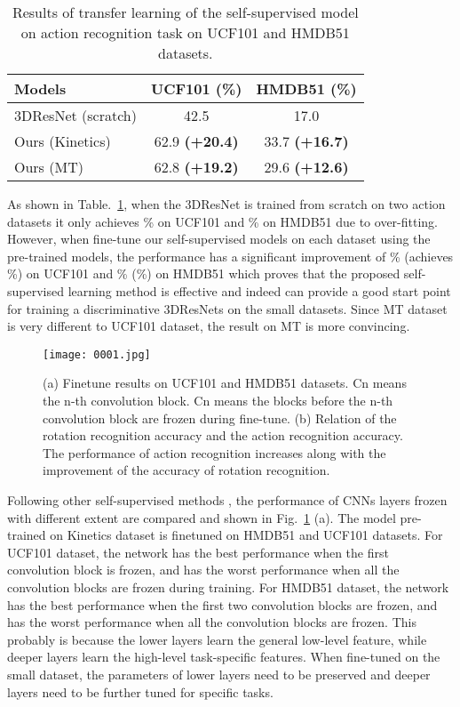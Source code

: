 \documentclass[10pt,twocolumn,letterpaper]{article}
\begin{document}
\begin{table}[hb]
\begin{center}
\begin{tabular}{l|c|c}
\hline
Models & UCF101 (\%) & HMDB51 (\%) \\
\hline\hline
3DResNet (scratch) \cite{3DResNet} & 42.5   & 17.0\\
Ours (Kinetics)                & 62.9 \textbf{(+20.4)}  & 33.7 \textbf{(+16.7)}\\
Ours (MT)                      & 62.8 \textbf{(+19.2)}  & 29.6 \textbf{(+12.6)}\\
\hline
\end{tabular}
\end{center}
\caption{Results of transfer learning of the self-supervised model on action recognition task on UCF101 and HMDB51 datasets.}
\label{tab:transfer}
\end{table}



As shown in Table.~\ref{tab:transfer}, when the 3DResNet is trained from scratch on two action datasets it only achieves \% on UCF101 and \% on HMDB51 due to over-fitting. However, when fine-tune our self-supervised models on each dataset using the pre-trained models, the performance has a significant improvement of \% (achieves \%) on UCF101 and \% (\%) on HMDB51  which proves that the proposed self-supervised learning method is effective and indeed can provide a good start point for training a discriminative 3DResNets on the small datasets. Since MT dataset is very different to UCF101 dataset, the result on MT is more convincing. 

\begin{figure}
\begin{center}
\texttt{[image: 0001.jpg]}
\end{center}
\caption{(a) Finetune results on UCF101 and HMDB51 datasets. Cn means the n-th convolution block. Cn means the blocks before the n-th convolution block are frozen during fine-tune. (b) Relation of the rotation recognition accuracy and the action recognition accuracy. The performance of action recognition increases along with the improvement of the accuracy of rotation recognition. }
\label{fig:rotation-acc}
\end{figure}

Following other self-supervised methods \cite{watchingmove}, the performance of CNNs layers frozen with different extent are compared and shown in Fig.~\ref{fig:rotation-acc} (a). The model pre-trained on Kinetics dataset is finetuned on HMDB51 and UCF101 datasets. For UCF101 dataset, the network has the best performance when the first convolution block is frozen, and has the worst performance when all the convolution blocks are frozen during training. For HMDB51 dataset, the network has the best performance when the first two convolution blocks are frozen, and has the worst performance when all the convolution blocks are frozen. This probably is because the lower layers learn the general low-level feature, while deeper layers learn the high-level task-specific features. When fine-tuned on the small dataset, the parameters of lower layers need to be preserved and deeper layers need to be further tuned for specific tasks. 
\end{document}
